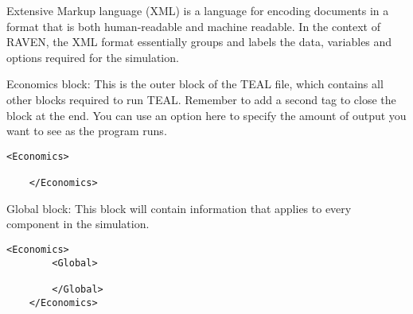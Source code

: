 Extensive Markup language (XML) is a language for encoding documents in a format that is both human-readable and machine readable. In the context of RAVEN, the XML format essentially groups and labels the data, variables and options required for the simulation.

Economics block:
This is the outer block of the TEAL file, which contains all other blocks required to run TEAL. Remember to add a second tag to close the block at the end. You can use an option here to specify the amount of output you want to see as the program runs.


\begin{lstlisting}[style=XML,morekeywords={class}]
    <Economics>

    </Economics>
\end{lstlisting}

Global block:
This block will contain information that applies to every component in the simulation. 
\begin{lstlisting}[style=XML,morekeywords={class}]
    <Economics>
        <Global>
        
        </Global>
    </Economics>
\end{lstlisting}

